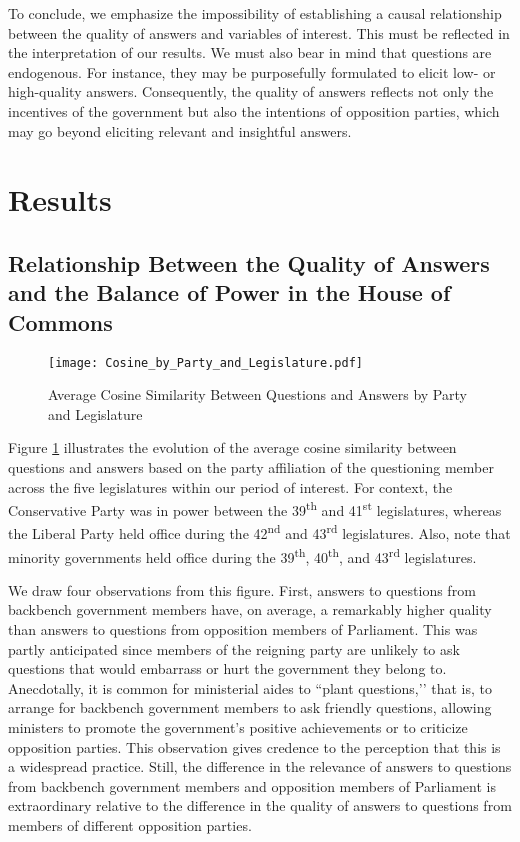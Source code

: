 {{To conclude, we emphasize the impossibility of establishing a causal relationship between the quality of answers and variables of interest. This must be reflected in the interpretation of our results. We must also bear in mind that questions are endogenous. For instance, they may be purposefully formulated to elicit low- or high-quality answers. Consequently, the quality of answers reflects not only the incentives of the government but also the intentions of opposition parties, which may go beyond eliciting relevant and insightful answers.

\section*{Results}

\subsection*{Relationship Between the Quality of Answers and the Balance of Power in the House of Commons}

\begin{figure}[!bp]
    \centering
    \texttt{[image: Cosine\_by\_Party\_and\_Legislature.pdf]}
    \caption{Average Cosine Similarity Between Questions and Answers by Party and Legislature}
    \label{fig:cosine_by_legislature}
\end{figure}

Figure \ref{fig:cosine_by_legislature} illustrates the evolution of the average cosine similarity between questions and answers based on the party affiliation of the questioning member across the five legislatures within our period of interest. For context, the Conservative Party was in power between the 39\textsuperscript{th} and 41\textsuperscript{st} legislatures, whereas the Liberal Party held office during the 42\textsuperscript{nd} and 43\textsuperscript{rd} legislatures. Also, note that minority governments held office during the 39\textsuperscript{th}, 40\textsuperscript{th}, and 43\textsuperscript{rd} legislatures.

We draw four observations from this figure. First, answers to questions from backbench government members have, on average, a remarkably higher quality than answers to questions from opposition members of Parliament. This was partly anticipated since members of the reigning party are unlikely to ask questions that would embarrass or hurt the government they belong to. Anecdotally, it is common for ministerial aides to ``plant questions,’’ that is, to arrange for backbench government members to ask friendly questions, allowing ministers to promote the government’s positive achievements or to criticize opposition parties. This observation gives credence to the perception that this is a widespread practice. Still, the difference in the relevance of answers to questions from backbench government members and opposition members of Parliament is extraordinary relative to the difference in the quality of answers to questions from members of different opposition parties.

}}
